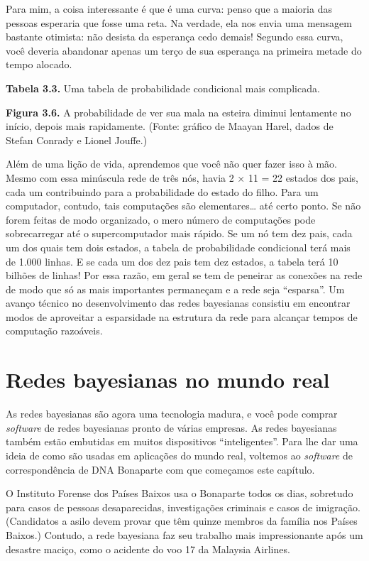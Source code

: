 \documentclass[11pt,a5paper,twoside]{book}
\begin{document}
Para mim, a coisa interessante é que é uma curva: penso que a maioria das pessoas esperaria que fosse uma reta. Na verdade, ela nos envia uma mensagem bastante otimista: não desista da esperança cedo demais! Segundo essa curva, você deveria abandonar apenas um terço de sua esperança na primeira metade do tempo alocado.

\textbf{Tabela 3.3.} Uma tabela de probabilidade condicional mais complicada.

\textbf{Figura 3.6.} A probabilidade de ver sua mala na esteira diminui lentamente no início, depois mais rapidamente. (Fonte: gráfico de Maayan Harel, dados de Stefan Conrady e Lionel Jouffe.)

Além de uma lição de vida, aprendemos que você não quer fazer isso à mão. Mesmo com essa minúscula rede de três nós, havia 2 × 11 = 22 estados dos pais, cada um contribuindo para a probabilidade do estado do filho. Para um computador, contudo, tais computações são elementares… até certo ponto. Se não forem feitas de modo organizado, o mero número de computações pode sobrecarregar até o supercomputador mais rápido. Se um nó tem dez pais, cada um dos quais tem dois estados, a tabela de probabilidade condicional terá mais de 1.000 linhas. E se cada um dos dez pais tem dez estados, a tabela terá 10 bilhões de linhas! Por essa razão, em geral se tem de peneirar as conexões na rede de modo que só as mais importantes permaneçam e a rede seja “esparsa”. Um avanço técnico no desenvolvimento das redes bayesianas consistiu em encontrar modos de aproveitar a esparsidade na estrutura da rede para alcançar tempos de computação razoáveis.

\section{Redes bayesianas no mundo real}
As redes bayesianas são agora uma tecnologia madura, e você pode comprar \textit{software} de redes bayesianas pronto de várias empresas. As redes bayesianas também estão embutidas em muitos dispositivos “inteligentes”. Para lhe dar uma ideia de como são usadas em aplicações do mundo real, voltemos ao \textit{software} de correspondência de DNA Bonaparte com que começamos este capítulo.

O Instituto Forense dos Países Baixos usa o Bonaparte todos os dias, sobretudo para casos de pessoas desaparecidas, investigações criminais e casos de imigração. (Candidatos a asilo devem provar que têm quinze membros da família nos Países Baixos.) Contudo, a rede bayesiana faz seu trabalho mais impressionante após um desastre maciço, como o acidente do voo 17 da Malaysia Airlines.
\end{document}
